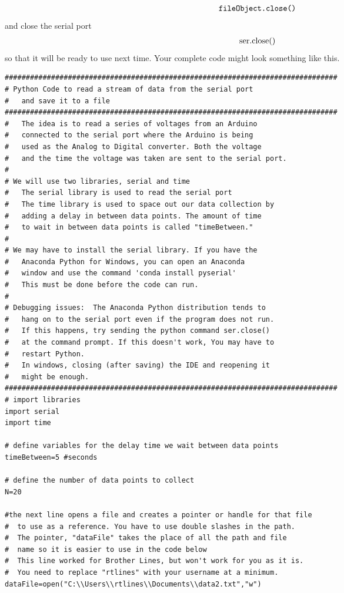 \begin{equation*}
\begin{tabular}{l}
\texttt{fileObject.close()}%
\end{tabular}%
\end{equation*}%
and close the serial port%
\begin{equation*}
\begin{tabular}{l}
ser.close()%
\end{tabular}%
\end{equation*}%
so that it will be ready to use next time. Your complete code might look
something like this.
\begin{verbatim}
###############################################################################
# Python Code to read a stream of data from the serial port
#   and save it to a file
###############################################################################
#   The idea is to read a series of voltages from an Arduino 
#   connected to the serial port where the Arduino is being 
#   used as the Analog to Digital converter. Both the voltage
#   and the time the voltage was taken are sent to the serial port.
#
# We will use two libraries, serial and time
#   The serial library is used to read the serial port
#   The time library is used to space out our data collection by
#   adding a delay in between data points. The amount of time 
#   to wait in between data points is called "timeBetween." 
#
# We may have to install the serial library. If you have the
#   Anaconda Python for Windows, you can open an Anaconda 
#   window and use the command 'conda install pyserial'
#   This must be done before the code can run.
#
# Debugging issues:  The Anaconda Python distribution tends to 
#   hang on to the serial port even if the program does not run. 
#   If this happens, try sending the python command ser.close()
#   at the command prompt. If this doesn't work, You may have to 
#   restart Python.
#   In windows, closing (after saving) the IDE and reopening it 
#   might be enough.
###############################################################################
# import libraries
import serial
import time
 
# define variables for the delay time we wait between data points
timeBetween=5 #seconds
 
# define the number of data points to collect
N=20
 
#the next line opens a file and creates a pointer or handle for that file
#  to use as a reference. You have to use double slashes in the path.
#  The pointer, "dataFile" takes the place of all the path and file
#  name so it is easier to use in the code below
#  This line worked for Brother Lines, but won't work for you as it is.
#  You need to replace "rtlines" with your username at a minimum.
dataFile=open("C:\\Users\\rtlines\\Documents\\data2.txt","w")
 

\end{verbatim}
